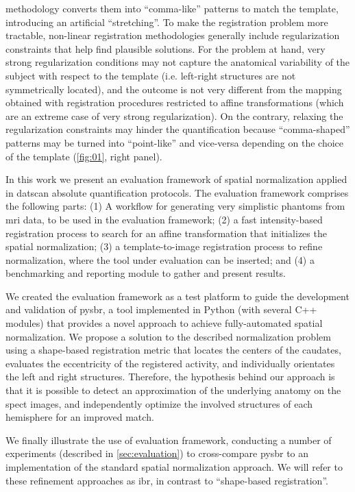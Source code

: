 \documentclass{frontiers}
\begin{document}
  methodology converts them into ``comma-like'' patterns to match the template,
  introducing an artificial ``stretching''.
To make the registration problem more tractable, non-linear registration 
  methodologies generally include regularization constraints that help
  find plausible solutions.
For the problem at hand, very strong regularization conditions may not 
  capture the anatomical variability of the subject with respect to the 
  template (i.e. left-right structures are not symmetrically located),
  and the outcome is not very different from the mapping
  obtained with registration procedures restricted to affine
  transformations (which are an extreme case of very strong
  regularization).
On the contrary, relaxing the regularization constraints may hinder the quantification 
  because ``comma-shaped'' patterns may be turned into ``point-like'' and vice-versa
  depending on the choice of the template (\autoref{fig:01}, right panel).

In this work we present an evaluation framework of spatial normalization
  applied in \gls*{datscan} absolute quantification protocols.
The evaluation framework comprises the following parts: 
(1) A workflow for generating very simplistic phantoms from
   \gls*{mri} data, to be used in the evaluation framework;
(2) a fast intensity-based registration process to search for an affine
   transformation that initializes the spatial normalization;
(3) a template-to-image registration process to refine normalization,
   where the tool under evaluation can be inserted; and
(4) a benchmarking and reporting module to gather and present results.

We created the evaluation framework as a test platform
  to guide the development and validation of \gls*{pysbr}, a tool 
  implemented in Python (with several C++ modules) that provides a novel
  approach to achieve fully-automated spatial normalization.
We propose a solution to the described normalization problem using a
  shape-based registration metric that locates the centers of the caudates,
  evaluates the eccentricity of the registered activity,
  and individually orientates the left and right structures.
Therefore, the hypothesis behind our approach is that it is possible to detect
  an approximation of the underlying anatomy on the \gls*{spect} images, and
  independently optimize the involved structures of each hemisphere for
  an improved match.

We finally illustrate the use of evaluation framework,
  conducting a number of experiments (described in
  \autoref{sec:evaluation}) to cross-compare \gls*{pysbr}
  to an implementation of the standard spatial normalization
  approach.
We will refer to these refinement approaches as \gls*{ibr},
  in contrast to ``shape-based registration''.
  
\end{document}
